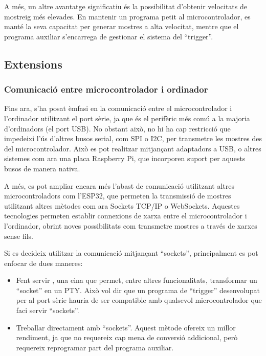 \documentclass{tfgitic}[2023/06/30]
\begin{document}
A més, un altre avantatge significatiu és la possibilitat d'obtenir
velocitats de mostreig més elevades. En mantenir un programa petit al
microcontrolador, es manté la seva capacitat per generar mostres a
alta velocitat, mentre que el programa auxiliar s'encarrega de
gestionar el sistema del ``trigger''.

\subsection{Extensions}
\label{subsec:extensions-osplot-pc}

\subsubsection{Comunicació entre microcontrolador i ordinador}

Fins ara, s'ha posat èmfasi en la comunicació entre el
microcontrolador i l'ordinador utilitzant el port sèrie, ja que és el
perifèric més comú a la majoria d'ordinadors (el port USB). No obstant
això, no hi ha cap restricció que impedeixi l'ús d'altres busos
serial, com SPI o I2C, per transmetre les mostres des del
microcontrolador. Això es pot realitzar mitjançant adaptadors a USB, o
altres sistemes com ara una placa Raspberry Pi, que incorporen suport
per aquests busos de manera nativa.

A més, es pot ampliar encara més l'abast de comunicació utilitzant
altres microcontroladors com l'ESP32, que permeten la transmissió de
mostres utilitzant altres mètodes com ara Sockets TCP/IP o
WebSockets. Aquestes tecnologies permeten establir connexions de xarxa
entre el microcontrolador i l'ordinador, obrint noves possibilitats
com transmetre mostres a través de xarxes sense fils.

Si es decideix utilitzar la comunicació mitjançant ``sockets'',
principalment es pot enfocar de dues maneres:

\begin{itemize}
	\item Fent servir \cite[socat]{socat}, una eina que permet,
          entre altres funcionalitats, transformar un ``socket'' en un
          PTY. Això vol dir que un programa de ``trigger''
          desenvolupat per al port sèrie hauria de ser compatible amb
          qualsevol microcontrolador que faci servir ``sockets''.
	\item Treballar directament amb ``sockets''. Aquest mètode
          ofereix un millor rendiment, ja que no requereix cap mena de
          conversió addicional, però requereix reprogramar part del
          programa auxiliar.
\end{itemize}
\end{document}
